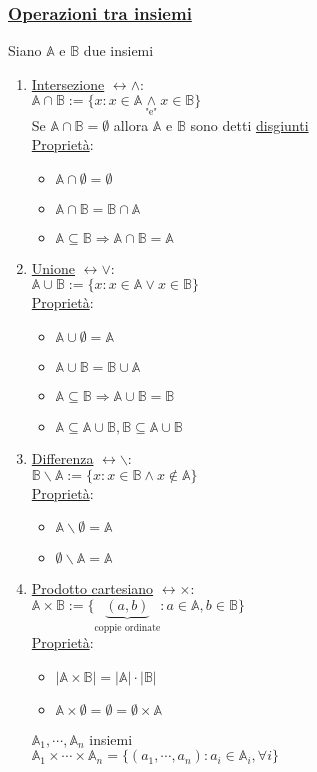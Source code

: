 \documentclass{article}
\newcommand{\ul}[1]{\underline{#1}}
\newcommand{\A}{\mathbb{A}}
\newcommand{\B}{\mathbb{B}}
\begin{document}
\subsubsection*{\color{blue}\ul{Operazioni tra insiemi}}
Siano $\A$ e $\B$ due insiemi
\begin{enumerate}
	\item \ul{Intersezione} \color{violet}$\leftrightarrow\wedge$\color{default}:\\
	      $\A\cap\B:=\{x:x\in\A\underset{\text{"e"}}{\wedge} x\in\B\}$\\
	      Se $\A\cap\B=\emptyset$ allora $\A$ e $\B$ sono detti \ul{disgiunti}\\
	      \ul{Proprietà}:
	      \begin{itemize}
		      \item $\A\cap\emptyset=\emptyset$
		      \item $\A\cap\B=\B\cap\A$
		      \item $\A\subseteq\B\Rightarrow\A\cap\B=\A$
	      \end{itemize}
	\item \ul{Unione} \color{violet}$\leftrightarrow\vee$\color{default}:\\
	      $\A\cup\B:=\{x:x\in\A\vee x\in\B\}$\\
	      \ul{Proprietà}:
	      \begin{itemize}
		      \item $\A\cup\emptyset=\A$
		      \item $\A\cup\B=\B\cup\A$
		      \item $\A\subseteq\B\Rightarrow\A\cup\B=\B$
		      \item $\A\subseteq\A\cup\B,\B\subseteq\A\cup\B$
	      \end{itemize}
	\item \ul{Differenza} \color{violet}$\leftrightarrow\backslash$\color{default}:\\
	      $\B\backslash\A:=\{x:x\in\B\wedge x\not\in\A\}$\\
	      \ul{Proprietà}:
	      \begin{itemize}
		      \item $\A\backslash\emptyset=\A$
		      \item $\emptyset\backslash\A=\A$
	      \end{itemize}
	\item \ul{Prodotto cartesiano} \color{violet}$\leftrightarrow\times$\color{default}:\\
	      $\A\times\B:=\{\underbrace{(a,b)}_{\text{coppie ordinate}}:a\in\A,b\in\B\}$\\
	      \ul{Proprietà}:
	      \begin{itemize}
		      \item $|\A\times\B|=|\A|\cdot|\B|$
		      \item $\A\times\emptyset=\emptyset=\emptyset\times\A$
	      \end{itemize}
	      $\A_1,\cdots,\A_n$ insiemi\\
	      $\A_1\times\cdots\times\A_n=\{(a_1,\cdots,a_n):a_i\in\A_i,\forall i\}$
\end{enumerate}
\end{document}
